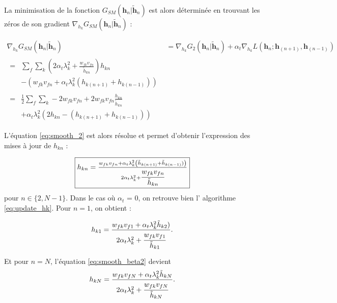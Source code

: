 La minimisation de la fonction $G_{SM}(\mathbf{h}_{n}\vert \mathbf{\tilde{h}}_{n})$ est alors déterminée en trouvant les zéros de son gradient $\nabla_{h_k} G_{SM}(\mathbf{h}_{n}\vert \mathbf{\tilde{h}}_{n})$ :

\begin{align}
\nabla_{h_{k}} G_{SM}(\mathbf{h}_{n}\vert \mathbf{\tilde{h}}_{n}) &= \nabla_{h_{k}} G_{2}(\mathbf{h}_{n}\vert \mathbf{\tilde{h}}_{n}) + \alpha_t \nabla_{h_{k}} L(\mathbf{h}_{n}; \mathbf{h}_{(n+1)}, \mathbf{h}_{(n-1)})\\
\begin{split}
    ={}& \sum_{f} \sum_{k} \left( 2\alpha_t \lambda_k^2 + \frac{w_{fk} v_{fn}}{\tilde{h}_{kn}}\right)h_{kn} \\
    & - \left(w_{fk} v_{fn} + \alpha_t \lambda_k^2 \left(h_{k(n+1)}+h_{k(n-1)}\right)\right) 
    \end{split}\\
\begin{split}
    ={}& \frac{1}{2}\sum_{f} \sum_{k} -2 w_{fk} v_{fn} + 2 w_{fk} v_{fn} \frac{h_{kn}}{\tilde{h}_{kn}} \\
    & + \alpha_t \lambda_k^2 \left( 2 h_{kn}- (h_{k(n+1)}+h_{k(n-1)}) \right)\label{eq:smooth_2}
\end{split}
\end{align}


L'équation \ref{eq:smooth_2} est alors résolue et permet d'obtenir l'expression des mises à jour de $h_{kn}$ : 

\begin{equation}\label{eq:smooth_beta2}
\fbox{$
h_{kn} = \frac{w_{fk} v_{fn}+\alpha_t  \lambda_k^2 \left(\tilde{h}_{k(n+1)}+\tilde{h}_{k(n-1)})\right)}{2\alpha_t \lambda_k^2 + \cfrac{w_{fk} v_{fn}} {\tilde{h}_{kn}}}$}
\end{equation}
pour $n \in \lbrace 2, N-1 \rbrace$. Dans le cas où $\alpha_t$ = 0, on retrouve bien l' algorithme \ref{eq:update_hk}. Pour $n = 1$, on obtient :  

\begin{equation}
h_{k1} = \frac{w_{fk} v_{f1}+\alpha_t \lambda_k^2 \tilde{h}_{k2})}{2\alpha_t \lambda_k^2 + \cfrac{w_{fk} v_{f1}}{\tilde{h}_{k1}}}.
\end{equation}

Et pour $n = N$, l'équation \ref{eq:smooth_beta2} devient 
\begin{equation}
h_{kN} = \frac{w_{fk} v_{fN}+\alpha_t  \lambda_k^2 \tilde{h}_{kN}}{2\alpha_t \lambda_k^2 + \cfrac{w_{fk} v_{fN}} {\tilde{h}_{kN}}}.
\end{equation}

